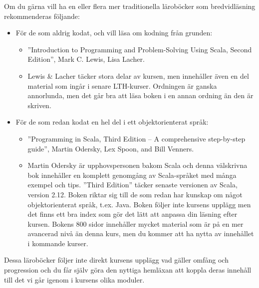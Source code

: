 Om du gärna vill ha en eller flera mer traditionella läroböcker som bredvidläsning rekommenderas följande:
\begin{itemize}[noitemsep, leftmargin=*]
\item För de som aldrig kodat, och vill läsa om kodning från grunden:
\begin{itemize}[nolistsep]
\item ''Introduction to Programming and Problem-Solving Using Scala, Second Edition'', Mark C. Lewis, Lisa Lacher.  %

\item Lewis \& Lacher täcker stora delar av kursen, men innehåller även en del material som ingår i senare LTH-kurser. Ordningen är ganska annorlunda, men det går bra att läsa boken i en annan ordning än den är skriven.
\end{itemize}
\item För de som redan kodat en hel del i ett objektorienterat språk:
\begin{itemize}[nolistsep, noitemsep]
\item ''Programming in Scala, Third Edition -- A comprehensive step-by-step guide'', Martin Odersky, Lex Spoon, and Bill Venners.  %
  \item Martin Odersky är upphovspersonen bakom Scala och denna välskrivna bok innehåller en komplett genomgång av Scala-språket med många exempel och tips. ''Third Edition'' täcker senaste versionen av Scala, version 2.12. Boken riktar sig till de som redan har kunskap om något objektorienterat språk, t.ex. Java. Boken följer inte kursens upplägg men det finns ett bra index som gör det lätt att anpassa din läsning efter kursen. Bokens 800 sidor innehåller mycket material som är på en mer avancerad nivå än denna kurs, men du kommer att ha nytta av innehållet i kommande kurser.
\end{itemize}
\end{itemize}
Dessa läroböcker följer inte direkt kursens upplägg vad gäller omfång och progression och du får själv göra den nyttiga hemläxan att koppla  deras innehåll till det vi går igenom i kursens olika moduler.

